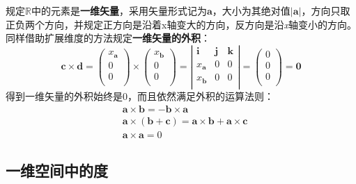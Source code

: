 \begin{definition}[一维矢量]
规定$\mathbb{R} $中的元素是{\bf 一维矢量}，采用矢量形式记为$\boldsymbol{a}$，大小为其绝对值$\left| \boldsymbol{a} \right|$，方向只取正负两个方向，并规定正方向是沿着x轴变大的方向，反方向是沿{\it x}轴变小的方向。
同样借助扩展维度的方法规定{\bf 一维矢量的外积}：
\[
\boldsymbol{c}\times \boldsymbol{d}=\left( \begin{array}{c}
	x_{\boldsymbol{a}}\\
	0\\
	0\\
\end{array} \right) \times \left( \begin{array}{c}
	x_{\boldsymbol{b}}\\
	0\\
	0\\
\end{array} \right) =\left| \begin{matrix}
	\mathbf{i}&		\mathbf{j}&		\mathbf{k}\\
	x_{\boldsymbol{a}}&		0&		0\\
	x_{\boldsymbol{b}}&		0&		0\\
\end{matrix} \right|=\left( \begin{array}{c}
	0\\
	0\\
	0\\
\end{array} \right) =\mathbf{0}
\]
得到一维矢量的外积始终是0，而且依然满足外积的运算法则：
\begin{align*}
&\boldsymbol{a}\times \boldsymbol{b}=-\boldsymbol{b}\times \boldsymbol{a} \\
&\boldsymbol{a}\times \left( \boldsymbol{b}+\boldsymbol{c} \right) =\boldsymbol{a}\times \boldsymbol{b}+\boldsymbol{a}\times \boldsymbol{c} \\
&\boldsymbol{a}\times \boldsymbol{a}=0
\end{align*}
\end{definition}

\subsection{一维空间中的度}

